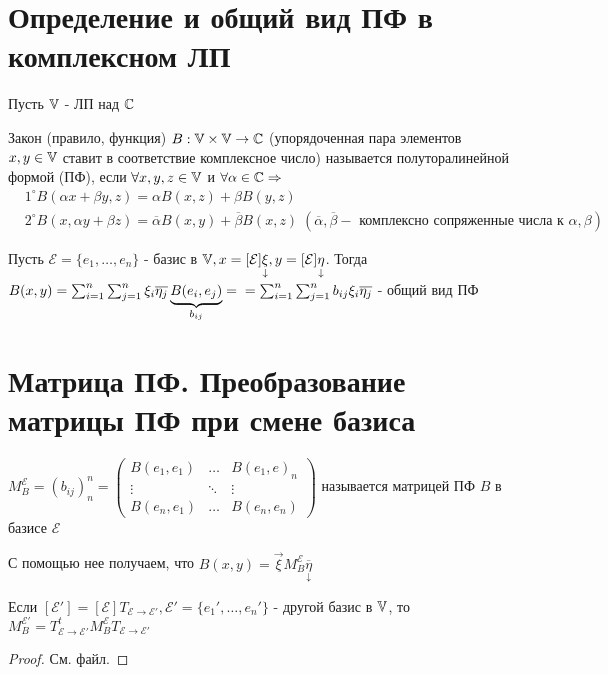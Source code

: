 \documentclass[../main.tex]{subfiles}
\begin{document}

\section{Определение и общий вид ПФ в комплексном ЛП}
Пусть $\mathbb{V}$ - ЛП над $\mathbb{C}$
\begin{definition}
    Закон (правило, функция) $B : \mathbb{V} \times \mathbb{V} \to \mathbb{C}$ (упорядоченная пара элементов $x,y\in\mathbb{V}$ ставит в соответствие комплексное число) называется полуторалинейной формой (ПФ), если $\forall x,y,z\in\mathbb{V} $ и $\forall \alpha \in \mathbb{C} \Rightarrow $
    $
    \begin{aligned}
        &1^{\circ} B(\alpha x + \beta y, z)= \alpha B(x,z) + \beta B(y,z) \\ 
        &2^{\circ} B(x,\alpha y + \beta z ) = \overline{\alpha} B(x,y) + \overline{\beta} B(x,z) \;(\overline{\alpha},\overline{\beta} - \text{ комплексно сопряженные числа к $\alpha,\beta$})
    \end{aligned}$
\end{definition}

Пусть $\mathcal{E} = \{ e_{1},\dots,e_{n}\}$ - базис в $\mathbb{V}, x = [\mathcal{E}]\underset{\downarrow}{\xi}, y = [\mathcal{E}]\underset{\downarrow}{\eta}$. 
Тогда $B(x,y) = \sum_{i =1}^{n  } \sum_{j=1}^{n} \xi_{i}\overline{\eta_{j}} \underbrace{B(e_{i},e_{j})}_{b_{ij}} =\\= \sum_{i  =1}^{n  } \sum_{j=1}^{n } b_{ij}\xi_{i}\overline{\eta_{j}} $ - общий вид ПФ 
\section{Матрица ПФ. Преобразование матрицы ПФ при смене базиса}
\begin{definition}
    $M_{B}^{\mathcal{E}} = (b_{ij})^{n}_{n} = \begin{pmatrix}
        B(e_{1},e_{1}) & \dots & B(e_{1},e)_{n} \\ 
        \vdots & \ddots & \vdots \\ 
        B(e_{n},e_{1}) & \dots & B(e_{n},e_{n})
    \end{pmatrix}$ называется матрицей ПФ $B$ в базисе $\mathcal{E}$
\end{definition}
С помощью нее получаем, что $B(x,y) = \vec{\xi} M_{B}^{\mathcal{E}}\overline{\underset{\downarrow}{\eta}}$
\begin{theorem}
    Если $[\mathcal{E'}] = [\mathcal{E}] T_{\mathcal{E}\to\mathcal{E'}}, \mathcal{E'} = \{e_{1}',\dots,e_{n}'\}$ - другой базис в $\mathbb{V}$, то $M_{B}^{\mathcal{E'}} = T_{\mathcal{E}\to\mathcal{E'}}^{t}M_{B}^{\mathcal{E}}T_{\mathcal{E}\to\mathcal{E'}}$
\end{theorem}
\begin{proof}
    См. файл.
\end{proof}
\end{document}
